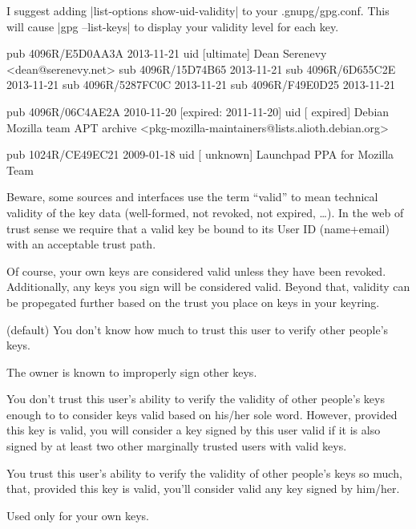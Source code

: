 \documentclass[letterpaper]{article}
\makeatletter
\def\section{\@startsection{section}{1}{\z@}{-2ex\@plus-.5ex\@minus-.2ex}{.001ex\@plus0ex\@minus.3ex}{\normalfont\Large\sffamily\bfseries}}
\def\tightitems{\setlength{\parskip}{0pt}}
\def\TODO#1{\textsl{[[TODO: #1]]}}
\renewcommand{\_}[1]{\ifmmode_{_{#1}}\else\underline{\phantom{n}}$\,$#1\fi}
\makeatother
\begin{document}
\section{Web of Trust}


I suggest adding |list-options show-uid-validity| to your .gnupg/gpg.conf.
This will cause |gpg --list-keys| to display your validity level for each
key.

\begin{code}
  pub   4096R/E5D0AA3A 2013-11-21
  uid       [ultimate] Dean Serenevy <dean@serenevy.net>
  sub   4096R/15D74B65 2013-11-21
  sub   4096R/6D655C2E 2013-11-21
  sub   4096R/5287FC0C 2013-11-21
  sub   4096R/F49E0D25 2013-11-21

  pub   4096R/06C4AE2A 2010-11-20 [expired: 2011-11-20]
  uid       [ expired] Debian Mozilla team APT archive <pkg-mozilla-maintainers@lists.alioth.debian.org>

  pub   1024R/CE49EC21 2009-01-18
  uid       [ unknown] Launchpad PPA for Mozilla Team
\end{code}

Beware, some sources and interfaces use the term ``valid'' to mean
technical validity of the key data (well-formed, not revoked, not expired,
\dots). In the web of trust sense we require that a valid key be bound to
its User ID (name+email) with an acceptable trust path.

Of course, your own keys are considered valid unless they have been
revoked. Additionally, any keys you sign will be considered valid. Beyond
that, validity can be propegated further based on the trust you place on
keys in your keyring.

\begin{description}\tightitems
\item[Unknown] (default) You don't know how much to trust this user to
  verify other people's keys.

\item[Never] The owner is known to improperly sign other keys.

\item[Marginal] You don't trust this user's ability to verify the validity
  of other people's keys enough to to consider keys valid based on his/her
  sole word. However, provided this key is valid, you will consider a key
  signed by this user valid if it is also signed by at least two other
  marginally trusted users with valid keys.

\item[Full] You trust this user's ability to verify the validity of other
  people's keys so much, that, provided this key is valid, you'll consider
  valid any key signed by him/her.

\item[Ultimate] Used only for your own keys.
\end{description}
\end{document}
